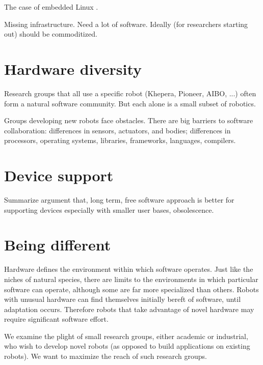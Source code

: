 \cite{natale05developmental}

\cite{nesnas2006claraty}

\cite{vaughan2006really}

\cite{vonkrogh2006promise}


The case of embedded Linux \cite{henkel2006selective}.

Missing infrastructure.
Need a lot of software.
Ideally (for researchers starting out) should be commoditized.

\section{Hardware diversity}

Research groups that all use a specific robot (Khepera, Pioneer, AIBO,
...) often form a natural software community.  But each alone is 
a small subset of robotics.

Groups developing new robots face obstacles.  There are big barriers
to software collaboration: differences in sensors, actuators, and
bodies; differences in processors, operating systems, libraries,
frameworks, languages, compilers.


\section{Device support}

Summarize argument that, long term, free software approach 
is better for supporting devices especially with smaller user
bases, obsolescence.

\section{Being different}


Hardware defines the environment within which software operates.  Just
like the niches of natural species, there are limits to the
environments in which particular software can operate, although some
are far more specialized than others.  Robots with unusual 
hardware can find themselves initially bereft of software,
until adaptation occurs.  Therefore robots that take advantage
of novel hardware may require significant software effort.

We examine the plight of small research groups, either academic or
industrial, who wish to develop novel robots (as opposed to 
build applications on existing robots).  We want to maximize the 
reach of such research groups.

